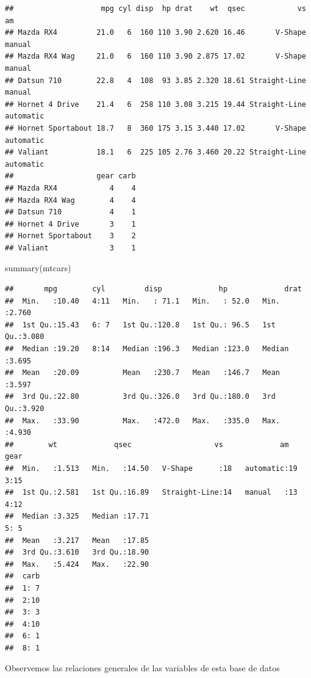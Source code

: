 \documentclass[
  12pt,
]{book}
\newenvironment{Shaded}{\begin{snugshade}}{\end{snugshade}}
\newcommand{\FunctionTok}[1]{\textcolor[rgb]{0.00,0.00,0.00}{#1}}
\newcommand{\NormalTok}[1]{#1}
\theoremstyle{definition}
\theoremstyle{definition}
\theoremstyle{definition}
\theoremstyle{definition}
\theoremstyle{remark}
\begin{document}
\begin{verbatim}
##                    mpg cyl disp  hp drat    wt  qsec            vs        am
## Mazda RX4         21.0   6  160 110 3.90 2.620 16.46       V-Shape    manual
## Mazda RX4 Wag     21.0   6  160 110 3.90 2.875 17.02       V-Shape    manual
## Datsun 710        22.8   4  108  93 3.85 2.320 18.61 Straight-Line    manual
## Hornet 4 Drive    21.4   6  258 110 3.08 3.215 19.44 Straight-Line automatic
## Hornet Sportabout 18.7   8  360 175 3.15 3.440 17.02       V-Shape automatic
## Valiant           18.1   6  225 105 2.76 3.460 20.22 Straight-Line automatic
##                   gear carb
## Mazda RX4            4    4
## Mazda RX4 Wag        4    4
## Datsun 710           4    1
## Hornet 4 Drive       3    1
## Hornet Sportabout    3    2
## Valiant              3    1
\end{verbatim}

\begin{Shaded}
\begin{Highlighting}[]
\FunctionTok{summary}\NormalTok{(mtcars)}
\end{Highlighting}
\end{Shaded}

\begin{verbatim}
##       mpg        cyl         disp             hp             drat      
##  Min.   :10.40   4:11   Min.   : 71.1   Min.   : 52.0   Min.   :2.760  
##  1st Qu.:15.43   6: 7   1st Qu.:120.8   1st Qu.: 96.5   1st Qu.:3.080  
##  Median :19.20   8:14   Median :196.3   Median :123.0   Median :3.695  
##  Mean   :20.09          Mean   :230.7   Mean   :146.7   Mean   :3.597  
##  3rd Qu.:22.80          3rd Qu.:326.0   3rd Qu.:180.0   3rd Qu.:3.920  
##  Max.   :33.90          Max.   :472.0   Max.   :335.0   Max.   :4.930  
##        wt             qsec                   vs             am     gear  
##  Min.   :1.513   Min.   :14.50   V-Shape      :18   automatic:19   3:15  
##  1st Qu.:2.581   1st Qu.:16.89   Straight-Line:14   manual   :13   4:12  
##  Median :3.325   Median :17.71                                     5: 5  
##  Mean   :3.217   Mean   :17.85                                           
##  3rd Qu.:3.610   3rd Qu.:18.90                                           
##  Max.   :5.424   Max.   :22.90                                           
##  carb  
##  1: 7  
##  2:10  
##  3: 3  
##  4:10  
##  6: 1  
##  8: 1
\end{verbatim}

Observemos las relaciones generales de las variables de esta base de datos
\end{document}
